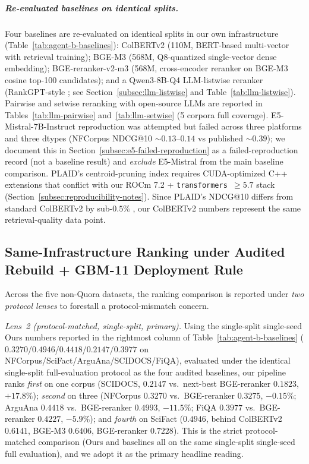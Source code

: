 \documentclass[review,1p]{elsarticle}
\begin{document}
\subparagraph{Re-evaluated baselines on identical splits.} Four baselines are re-evaluated on identical splits in our own infrastructure (Table~\ref{tab:agent-b-baselines}): ColBERTv2 (110M, BERT-based multi-vector with retrieval training); BGE-M3 (568M, Q8-quantized single-vector dense embedding); BGE-reranker-v2-m3 (568M, cross-encoder reranker on BGE-M3 cosine top-100 candidates); and a Qwen3-8B-Q4 LLM-listwise reranker (RankGPT-style \citep{sun2024rankgpt}; see Section~\ref{subsec:llm-listwise} and Table~\ref{tab:llm-listwise}). Pairwise and setwise reranking with open-source LLMs are reported in Tables~\ref{tab:llm-pairwise} and~\ref{tab:llm-setwise} (5 corpora full coverage). E5-Mistral-7B-Instruct reproduction was attempted but failed across three platforms and three dtypes (NFCorpus NDCG@10 $\sim 0.13$--$0.14$ vs published $\sim 0.39$); we document this in Section~\ref{subsec:e5-failed-reproduction} as a failed-reproduction record (not a baseline result) and \emph{exclude} E5-Mistral from the main baseline comparison. PLAID's centroid-pruning index requires CUDA-optimized C++ extensions that conflict with our ROCm 7.2 + \texttt{transformers $\ge 5.7$} stack (Section~\ref{subsec:reproducibility-notes}). Since PLAID's NDCG@10 differs from standard ColBERTv2 by sub-$0.5\%$ \citep[Table~5]{santhanam2022colbertv2}, our ColBERTv2 numbers represent the same retrieval-quality data point.

\subsection{Same-Infrastructure Ranking under Audited Rebuild + GBM-11 Deployment Rule}\label{subsec:same-infra-ranking}
Across the five non-Quora datasets, the ranking comparison is reported under \emph{two protocol lenses} to forestall a protocol-mismatch concern.

\textit{Lens~2 (protocol-matched, single-split, primary).} Using the single-split single-seed Ours numbers reported in the rightmost column of Table~\ref{tab:agent-b-baselines} ($0.3270$/$0.4946$/$0.4418$/$0.2147$/$0.3977$ on NFCorpus/SciFact/ArguAna/SCIDOCS/FiQA), evaluated under the identical single-split full-evaluation protocol as the four audited baselines, our pipeline ranks \emph{first} on one corpus (SCIDOCS, $0.2147$ vs.\ next-best BGE-reranker $0.1823$, $+17.8\%$); \emph{second} on three (NFCorpus $0.3270$ vs.\ BGE-reranker $0.3275$, $-0.15\%$; ArguAna $0.4418$ vs.\ BGE-reranker $0.4993$, $-11.5\%$; FiQA $0.3977$ vs.\ BGE-reranker $0.4227$, $-5.9\%$); and \emph{fourth} on SciFact ($0.4946$, behind ColBERTv2 $0.6141$, BGE-M3 $0.6406$, BGE-reranker $0.7228$). This is the strict protocol-matched comparison (Ours and baselines all on the same single-split single-seed full evaluation), and we adopt it as the primary headline reading.
\end{document}
